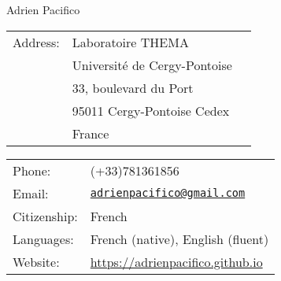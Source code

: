 \documentclass[a4paper,11pt]{article} %
\begin{document}




\vspace{1.5cm}

\begin{center}

{\LARGE Adrien Pacifico} \\





\medskip



\end{center}


\vspace{0.25in}

\begin{minipage}{0.50\linewidth}
\begin{tabular}{lll}
 Address: & Laboratoire THEMA\\
 & Université de Cergy-Pontoise\\
 & 33, boulevard du Port\\
&95011 Cergy-Pontoise Cedex\\
&France\\


\end{tabular}


\end{minipage}
\begin{minipage}{0.50\linewidth}
  \begin{tabular}{ll}
    Phone: & (+33)781361856 \\
    Email: & \href{mailto:adrienpacifico@gmail.com}{\tt adrienpacifico@gmail.com} \\
     Citizenship: & French \\
     Languages:&French (native), English (fluent)\\ 
     Website: &\url{https://adrienpacifico.github.io}

  \end{tabular}
\end{minipage}
\vspace{-0.3cm}
\end{document}
